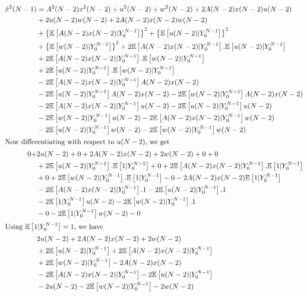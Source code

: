 \documentclass[12pt]{caltech_thesis}
\begin{document}
\begin{align*}
\tilde{x}^{2}(N-1)&=A^{2}(N-2)x^{2}(N-2) + u^{2}(N-2) + w^{2}(N-2) +2A(N-2)x(N-2)u(N-2)\\&+2u(N-2)w(N-2)+2A(N-2)x(N-2)w(N-2) \\&+\left\lbrace\mathbb{E}\left[A(N-2)x(N-2)|Y_{0}^{N-1}\right]\right\rbrace^{2}+\left\lbrace\mathbb{E}\left[u(N-2)|Y_{0}^{N-1}\right]\right\rbrace^{2}\\&+\left\lbrace\mathbb{E}\left[w(N-2)|Y_{0}^{N-1}\right]\right\rbrace^{2}+2\mathbb{E}\left[A(N-2)x(N-2)|Y_{0}^{N-1}\right].\mathbb{E}\left[u(N-2)|Y_{0}^{N-1}\right]\\&+2\mathbb{E}\left[A(N-2)x(N-2)|Y_{0}^{N-1}\right].\mathbb{E}\left[w(N-2)|Y_{0}^{N-1}\right]\\&+2\mathbb{E}\left[u(N-2)|Y_{0}^{N-1}\right].\mathbb{E}\left[w(N-2)|Y_{0}^{N-1}\right]\\&-2\mathbb{E}\left[A(N-2)x(N-2)|Y_{0}^{N-1}\right]A(N-2)x(N-2)\\&-2\mathbb{E}\left[u(N-2)|Y_{0}^{N-1}\right]A(N-2)x(N-2)-2\mathbb{E}\left[w(N-2)|Y_{0}^{N-1}\right]A(N-2)x(N-2)\\&-2\mathbb{E}\left[A(N-2)x(N-2)|Y_{0}^{N-1}\right]u(N-2)-2\mathbb{E}\left[u(N-2)|Y_{0}^{N-1}\right]u(N-2)\\&-2\mathbb{E}\left[w(N-2)|Y_{0}^{N-1}\right]u(N-2)-2\mathbb{E}\left[A(N-2)x(N-2)|Y_{0}^{N-1}\right]w(N-2)\\&-2\mathbb{E}\left[u(N-2)|Y_{0}^{N-1}\right]w(N-2)-2\mathbb{E}\left[w(N-2)|Y_{0}^{N-1}\right]w(N-2)\\
\intertext{Now differentiating with respect to $u(N-2)$, we get}
0+&2u(N-2)+0+2A(N-2)x(N-2)+2w(N-2)+0+0\\&+2\mathbb{E}\left[u(N-2)|Y_{0}^{N-1}\right].\mathbb{E}\left[1|Y_{0}^{N-1}\right]+0+2\mathbb{E}\left[A(N-2)x(N-2)|Y_{0}^{N-1}\right].\mathbb{E}\left[1|Y_{0}^{N-1}\right]\\&+0+2\mathbb{E}\left[w(N-2)|Y_{0}^{N-1}\right].\mathbb{E}\left[1|Y_{0}^{N-1}\right]-0-2A(N-2)x(N-2)\mathbb{E}\left[1|Y_{0}^{N-1}\right]\\&-2\mathbb{E}\left[A(N-2)x(N-2)|Y_{0}^{N-1}\right].1-2\mathbb{E}\left[u(N-2)|Y_{0}^{N-1}\right].1\\&-2\mathbb{E}\left[1|Y_{0}^{N-1}\right]u(N-2)-2\mathbb{E}\left[w(N-2)|Y_{0}^{N-1}\right].1\\&-0-2\mathbb{E}\left[1|Y_{0}^{N-1}\right]w(N-2)-0\\
\intertext{Using $\mathbb{E}\left[1|Y_{0}^{N-1}\right] = 1$, we have}
&2u(N-2)+2A(N-2)x(N-2)+2w(N-2)\\&+2\mathbb{E}\left[u(N-2)|Y_{0}^{N-1}\right]+2\mathbb{E}\left[A(N-2)x(N-2)|Y_{0}^{N-1}\right]\\&+2\mathbb{E}\left[w(N-2)|Y_{0}^{N-1}\right]-2A(N-2)x(N-2)\\&-2\mathbb{E}\left[A(N-2)x(N-2)|Y_{0}^{N-1}\right]-2\mathbb{E}\left[u(N-2)|Y_{0}^{N-1}\right]\\&-2u(N-2)-2\mathbb{E}\left[w(N-2)|Y_{0}^{N-1}\right]-2w(N-2)
\end{align*}
\end{document}
